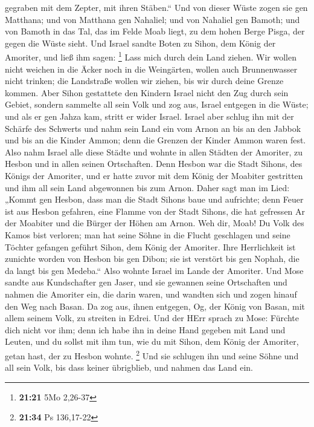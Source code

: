 gegraben mit dem Zepter, mit ihren Stäben.`` Und von dieser Wüste zogen
sie gen Matthana;  und von Matthana gen Nahaliel; und von
Nahaliel gen Bamoth;  und von Bamoth in das Tal, das im
Felde Moab liegt, zu dem hohen Berge Pisga, der gegen die Wüste sieht.
 Und Israel sandte Boten zu Sihon, dem König der
Amoriter, und ließ ihm sagen: \footnote{\textbf{21:21} 5Mo 2,26-37}
 Lass mich durch dein Land ziehen. Wir wollen nicht
weichen in die Äcker noch in die Weingärten, wollen auch Brunnenwasser
nicht trinken; die Landstraße wollen wir ziehen, bis wir durch deine
Grenze kommen.  Aber Sihon gestattete den Kindern Israel
nicht den Zug durch sein Gebiet, sondern sammelte all sein Volk und zog
aus, Israel entgegen in die Wüste; und als er gen Jahza kam, stritt er
wider Israel.  Israel aber schlug ihn mit der Schärfe des
Schwerts und nahm sein Land ein vom Arnon an bis an den Jabbok und bis
an die Kinder Ammon; denn die Grenzen der Kinder Ammon waren fest.
 Also nahm Israel alle diese Städte und wohnte in allen
Städten der Amoriter, zu Hesbon und in allen seinen Ortschaften.
 Denn Hesbon war die Stadt Sihons, des Königs der
Amoriter, und er hatte zuvor mit dem König der Moabiter gestritten und
ihm all sein Land abgewonnen bis zum Arnon.  Daher sagt
man im Lied: „Kommt gen Hesbon, dass man die Stadt Sihons baue und
aufrichte;  denn Feuer ist aus Hesbon gefahren, eine
Flamme von der Stadt Sihons, die hat gefressen Ar der Moabiter und die
Bürger der Höhen am Arnon.  Weh dir, Moab! Du Volk des
Kamos bist verloren; man hat seine Söhne in die Flucht geschlagen und
seine Töchter gefangen geführt Sihon, dem König der Amoriter.
 Ihre Herrlichkeit ist zunichte worden von Hesbon bis gen
Dibon; sie ist verstört bis gen Nophah, die da langt bis gen Medeba.``
 Also wohnte Israel im Lande der Amoriter.
 Und Mose sandte aus Kundschafter gen Jaser, und sie
gewannen seine Ortschaften und nahmen die Amoriter ein, die darin waren,
 und wandten sich und zogen hinauf den Weg nach Basan. Da
zog aus, ihnen entgegen, Og, der König von Basan, mit allem seinem Volk,
zu streiten in Edrei.  Und der HErr sprach zu Mose:
Fürchte dich nicht vor ihm; denn ich habe ihn in deine Hand gegeben mit
Land und Leuten, und du sollst mit ihm tun, wie du mit Sihon, dem König
der Amoriter, getan hast, der zu Hesbon wohnte. \footnote{\textbf{21:34}
  Ps 136,17-22}  Und sie schlugen ihn und seine Söhne und
all sein Volk, bis dass keiner übrigblieb, und nahmen das Land ein.

